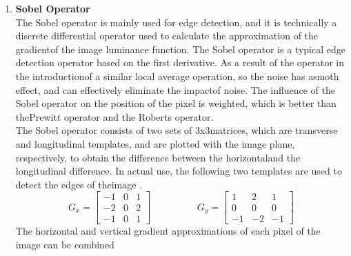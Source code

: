         \begin{enumerate}[label=(\alph*)]
                \item \textbf{Sobel Operator} \\
                The Sobel operator is mainly used for edge detection, and it is technically a discrete differential
                operator used to calculate the approximation of the gradientof the image luminance function.
                The Sobel operator is a typical edge detection operator based on the first derivative.
                As a result of the operator in the introductionof a similar local average operation,
                so the noise has asmoth effect, and can effectively eliminate the impactof noise.
                The influence of the Sobel operator on the position of the pixel is weighted, which is better
                than thePrewitt operator and the Roberts operator.\\
                The Sobel operator consists of two sets of 3x3matrices, which are transverse and longitudinal templates,
                and are plotted with the image plane, respectively, to obtain the difference between the horizontaland
                the longitudinal difference. In actual use, the following two templates are used to detect the edges of theimage \cite{1.18}.
                        \begin{equation}
                                G_x =
                                \begin{bmatrix}
                                        -1 & 0 & 1 \\
                                        -2 & 0 & 2 \\
                                        -1 & 0 & 1
                                \end{bmatrix}
                                \hspace{2cm}
                                G_y =
                                \begin{bmatrix}
                                        1 & 2 & 1 \\
                                        0 & 0 & 0 \\
                                        -1 & -2 & -1
                                \end{bmatrix}
                                \label{eq:eq07}
                        \end{equation}
                The horizontal and vertical gradient approximations of each pixel of the image can be combined

\end{enumerate}
